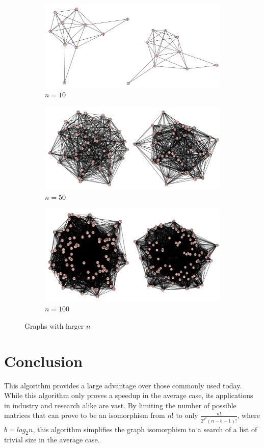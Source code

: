 \documentclass[12pt]{article}
\begin{document}
\begin{figure}[b]
\centering
\begin{subfigure}{.5\textwidth}
  \centering
  \includegraphics[width=.55\linewidth]{LargeN10}
  \caption{$n=10$}
  \label{fig:sub1}
\end{subfigure}%
\begin{subfigure}{.5\textwidth}
  \centering
  \includegraphics[width=.55\linewidth]{LargeN50}
  \caption{$n=50$}
  \label{fig:sub2}
\end{subfigure}
\begin{subfigure}{.5\textwidth}
  \centering
  \includegraphics[width=.55\linewidth]{LargeN100}
  \caption{$n=100$}
  \label{fig:sub2}
\end{subfigure}
\caption{Graphs with larger $n$}
\label{fig:Graphs}
\end{figure}

\section{Conclusion}
This algorithm provides a large advantage over those commonly used today. While this algorithm only proves a speedup in the average case, its applications in industry and research alike are vast. By limiting the number of possible matrices that can prove to be an isomorphism from $n!$ to only 
$\frac{n!}{2^{b^2} (n-b-1)!}$, where $b = log_2 n$, this algorithm simplifies the graph isomorphism to a search of a list of trivial size in the average case. 
\end{document}
